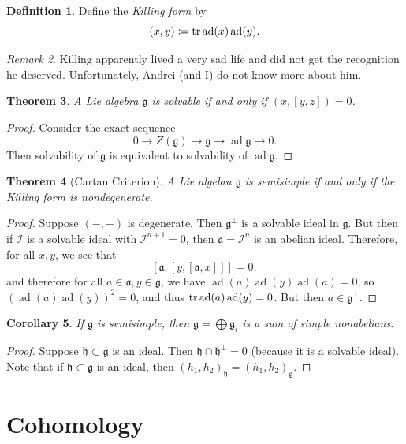 \documentclass[leqno, openany]{memoir}
\newtheorem{thm}{Theorem}[section]
\newtheorem{cor}[thm]{Corollary}
\theoremstyle{definition}
\newtheorem{defn}[thm]{Definition}
\theoremstyle{remark}
\newtheorem{rmk}[thm]{Remark}
\theoremstyle{plain}
\theoremstyle{definition}
\theoremstyle{remark}
\newcommand{\mf}[1]{\mathfrak{#1}}
\newcommand{\msc}[1]{\mathscr{#1}}
\DeclareMathOperator{\ad}{ad}
\begin{document}
\begin{defn}
    Define the \textit{Killing form} by
    \[ (x,y) \coloneqq \tr \ad(x) \ad(y). \]
\end{defn}

\begin{rmk}
    Killing apparently lived a very sad life and did not get the recognition he deserved. Unfortunately, Andrei (and I) do not know more about him.
\end{rmk}

\begin{thm}
    A Lie algebra $\mf{g}$ is solvable if and only if $(x, [y,z]) = 0$.
\end{thm}

\begin{proof}
    Consider the exact sequence
    \[ 0 \to Z(\mf{g}) \to \mf{g} \to \ad \mf{g} \to 0. \]
    Then solvability of $\mf{g}$ is equivalent to solvability of $\ad \mf{g}$.
\end{proof}

\begin{thm}[Cartan Criterion]
    A Lie algebra $\mf{g}$ is semisimple if and only if the Killing form is nondegenerate.
\end{thm}

\begin{proof}
    Suppose $(-,-)$ is degenerate. Then $\mf{g}^{\perp}$ is a solvable ideal in $\mf{g}$. But then if $\msc{I}$ is a solvable ideal with $\msc{I}^{n+1} = 0$, then $\mf{a} = \msc{I}^n$ is an abelian ideal. Therefore, for all $x,y$, we see that
    \[ [\mf{a}, [y,[\mf{a}, x]]] = 0, \]
    and therefore for all $a \in \mf{a}, y \in \mf{g}$, we have $\ad (a) \ad(y) \ad(a) = 0$, so ${(\ad(a) \ad(y))}^2 = 0$, and thus $\tr \ad(a) \ad(y) = 0$. But then $a \in \mf{g}^{\perp}$.
\end{proof}

\begin{cor}
    If $\mf{g}$ is semisimple, then $\mf{g} = \bigoplus \mf{g}_i$ is a sum of simple nonabelians.
\end{cor}

\begin{proof}
    Suppose $\mf{h} \subset \mf{g}$ is an ideal. Then $\mf{h} \cap \mf{h}^{\perp} = 0$ (because it is a solvable ideal). Note that if $\mf{h} \subset \mf{g}$ is an ideal, then ${(h_1, h_2)}_{\mf{h}} = {(h_1, h_2)}_{\mf{g}}$.
\end{proof}

\chapter{Cohomology}%
\label{cha:cohomology}
\end{document}
